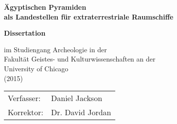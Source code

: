 


\thispagestyle{empty}
\vspace{4cm}
\begin{center}
\textbf{\Large{Ägyptischen Pyramiden}} \\
\vspace{1cm}
\textbf{\large{als Landestellen für extraterrestriale Raumschiffe}}
\vspace{3cm}



\Large{\textbf{Dissertation}} 

\vspace{0.5cm}
im Studiengang Archeologie
in der\\
Fakultät Geistes- und Kulturwissenschaften an der\\
University of Chicago\\
(2015)
\end{center}

\vspace {5cm}

\begin{tabular}{l l}
  Verfasser: & Daniel Jackson\\ 
  Korrektor: & Dr. David Jordan \\ 
\end{tabular} 
